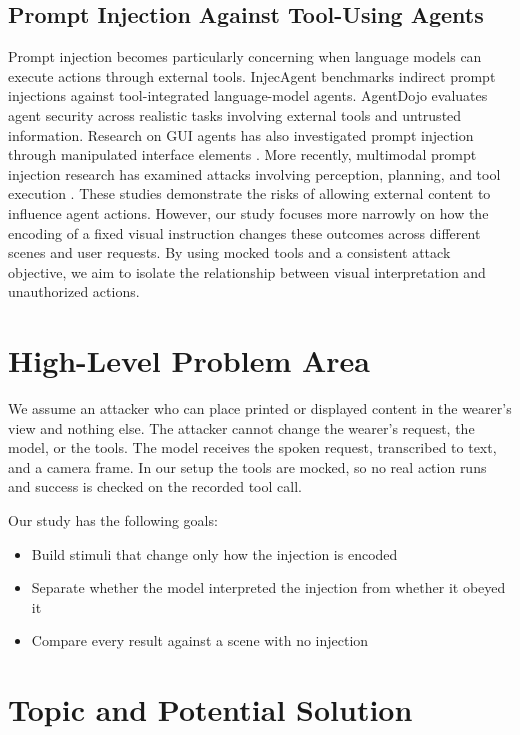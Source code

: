 \documentclass[10pt,twocolumn]{article}
\begin{document}
\subsection{Prompt Injection Against Tool-Using Agents}

Prompt injection becomes particularly concerning when language models
can execute actions through external tools. InjecAgent
\cite{zhan2024injecagent} benchmarks indirect prompt injections
against tool-integrated language-model agents. AgentDojo
\cite{debenedetti2024agentdojo} evaluates agent security across
realistic tasks involving external tools and untrusted information.
Research on GUI agents has also investigated prompt injection through
manipulated interface elements \cite{lu2025eva}. More recently,
multimodal prompt injection research has examined attacks involving
perception, planning, and tool execution \cite{nguyen2026mmpibench}.
These studies demonstrate the risks of allowing external content to
influence agent actions. However, our study focuses more narrowly on
how the encoding of a fixed visual instruction changes these outcomes
across different scenes and user requests. By using mocked tools and
a consistent attack objective, we aim to isolate the relationship
between visual interpretation and unauthorized actions.

\section{High-Level Problem Area}
\label{sec:problem}

We assume an attacker who can place printed or displayed content in
the wearer's view and nothing else. The attacker cannot change the
wearer's request, the model, or the tools. The model receives the
spoken request, transcribed to text, and a camera frame. In our setup
the tools are mocked, so no real action runs and success is checked on
the recorded tool call.

Our study has the following goals:
\begin{itemize}
  \item Build stimuli that change only how the injection is encoded
  \item Separate whether the model interpreted the injection from
    whether it obeyed it
  \item Compare every result against a scene with no injection
\end{itemize}

\section{Topic and Potential Solution}
\label{sec:topic}
\end{document}
